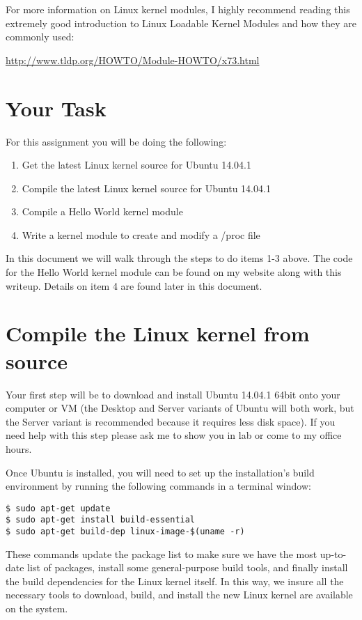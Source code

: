 \documentclass[11pt]{article}
\begin{document}
For more information on Linux kernel modules, I highly recommend reading this extremely good introduction to Linux Loadable Kernel Modules and how they are commonly used:

{\url{http://www.tldp.org/HOWTO/Module-HOWTO/x73.html}}


\section*{Your Task}

For this assignment you will be doing the following:

\begin{enumerate}
\item{Get the latest Linux kernel source for Ubuntu 14.04.1}
\item{Compile the latest Linux kernel source for Ubuntu 14.04.1}
\item{Compile a Hello World kernel module}
\item{Write a kernel module to create and modify a /proc file}
\end{enumerate}

In this document we will walk through the steps to do items 1-3 above. The code for the Hello World kernel module can be found on my website along with this writeup. Details on item 4 are found later in this document. 



\section*{Compile the Linux kernel from source}
Your first step will be to download and install Ubuntu 14.04.1 64bit \cite{ubuntuserver} onto your computer or VM (the Desktop and Server variants of Ubuntu will both work, but the Server variant is recommended because it requires less disk space). If you need help with this step please ask me to show you in lab or come to my office hours.

Once Ubuntu is installed, you will need to set up the installation's build environment by running the following commands in a terminal window:

\begin{verbatim}
$ sudo apt-get update
$ sudo apt-get install build-essential
$ sudo apt-get build-dep linux-image-$(uname -r)
\end{verbatim}

These commands update the package list to make sure we have the most up-to-date list of packages, install some general-purpose build tools, and finally install the build dependencies for the Linux kernel itself. In this way, we insure all the necessary tools to download, build, and install the new Linux kernel are available on the system.
\end{document}
